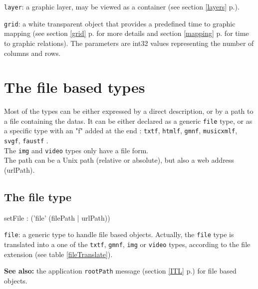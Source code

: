 \documentclass[a4paper,twoside]{report}
\newcommand{\sublevel}[1]	{\section{#1}}
\newcommand{\subsublevel}[1]	{\subsection{#1}}
\newcommand{\fullref}[1]	{\ref{#1} p.\pageref{#1}}
\newcommand{\OSC}[1]		{\texttt{#1}}
\renewcommand{\seealso}		{\textbf{See also: }}
\let\olditemize\itemize
\let\oldenditemize\enditemize
\renewenvironment{itemize} 	{\olditemize \setlength{\itemsep}{1mm}}{\oldenditemize}
\begin{document}
\begin{itemize}
\item \OSC{layer}: a graphic layer, may be viewed as a container (see section \fullref{layers}).
\item \OSC{grid}: a white transparent object that provides a predefined time to graphic mapping (see section \fullref{grid} for more details and section \fullref{mapping} for time to graphic relations). The parameters are int32 values representing the number of columns and rows.
\end{itemize}


\sublevel{The file based types}
\label{filebasedtypes}

Most of the types can be either expressed by a direct description, or by a path to a file containing the datas. It can be either declared as a generic \OSC{file} type, or as a specific type with an "f" added at the end : 
\OSC{txtf}, \OSC{htmlf}, \OSC{gmnf}, \OSC{musicxmlf}, \OSC{svgf}, \OSC{faustf} .\\
The \OSC{img} and  \OSC{video} types only have a file form. \\
The path can be a Unix path (relative or absolute), but also a web address (urlPath).


\subsublevel{The file type}
\label{fileset}

\label{setfile}
\begin{rail}
setFile : 
	('file' (filePath | urlPath))
\end{rail}

\begin{itemize}
\item \OSC{file}: a generic type to handle file based objects. Actually, the \OSC{file} type is translated into a one of the \OSC{txtf}, \OSC{gmnf}, \OSC{img} or \OSC{video} types, according to the file extension (see table \ref{fileTranslate}).
\end{itemize}

\seealso the application \OSC{rootPath} message (section \fullref{ITL}) for file based objects.
\end{document}
